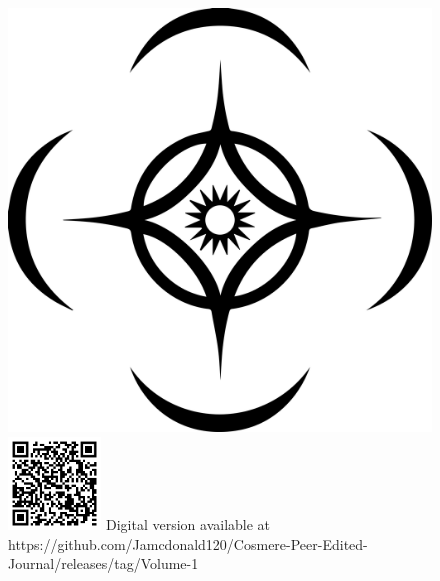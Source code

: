 \documentclass[conference]{IEEEtran}
\begin{document}
\clearpage
\begin{figure}
\begin{center}
	\vspace*{15pt}
\fontsize{40}{50}\vspace{30pt}
\includegraphics[width=\textwidth,align=c]{images/cosmere_symbol_max.png}\\\vspace{30pt}
\fontsize{20}{30}\selectfont{Volume 1\\}
\includegraphics[width=70pt,right]{images/digital_version.png}
\small{}Digital version available at https://github.com/Jamcdonald120/Cosmere-Peer-Edited-Journal/releases/tag/Volume-1

\end{center}
\end{figure}
\end{document}
